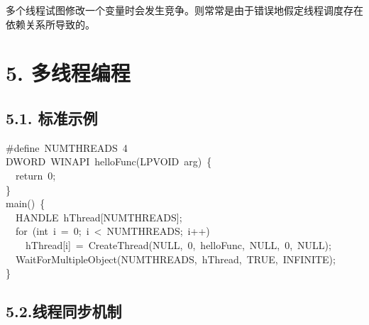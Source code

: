 \documentclass{article}
\begin{document}
\noindent{}多个线程试图修改一个变量时会发生竞争。则常常是由于错误地假定线程调度存在依赖关系所导致的。%

\section{5.\hspace*{0.5em} 多线程编程}\label{sec-windows-}%

\subsection{5.1.\hspace*{0.5em} 标准示例}\label{sec-win32-}%
\begin{mdpre}%
\noindent\#define~{NUMTHREADS}~{4}\\
{DWORD}~{WINAPI}~helloFunc({LPVOID}~arg)~\{\\
~~{return}~{0};\\
\}\\
main()~\{\\
~~{HANDLE}~hThread[{NUMTHREADS}];\\
~~{for}~({int}~i~=~{0};~i~\textless{}~{NUMTHREADS};~i++)\\
~~~~hThread[i]~=~{CreateThread}({NULL},~{0},~helloFunc,~{NULL},~{0},~{NULL});\\
~~{WaitForMultipleObject}({NUMTHREADS},~hThread,~{TRUE},~{INFINITE});\\
\}%
\end{mdpre}
\subsection{5.2.\hspace*{0.5em}线程同步机制}\label{section}%

\end{document}
